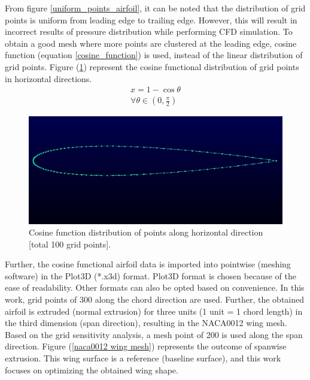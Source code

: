 From figure \ref{uniform_points_airfoil}, it can be noted that the distribution of grid points is uniform from leading edge to trailing edge. However, this will result in incorrect results of pressure distribution while performing CFD simulation. To obtain a good mesh where more points are clustered at the leading edge, cosine function (equation \ref{cosine_function}) is used, instead of the linear distribution of grid points. Figure (\ref{cosine_points_airfoil}) represent the cosine functional distribution of grid points in horizontal directions.
\begin{equation}
    \begin{array}{l}
        x = 1 - \cos{\theta}  \\
        \forall  \theta \in \left(0, \frac{\pi}{2}\right)
    \end{array}
\label{cosine_function}
\end{equation}

\begin{figure}[!htbp]
    \centering
    \includegraphics[scale = 0.4]{figures/airfoil_cosine.png}
    \caption{Cosine function distribution of points along horizontal direction [total 100 grid points].}
    \label{cosine_points_airfoil}
\end{figure}

Further, the cosine functional airfoil data is imported into pointwise (meshing software) in the Plot3D (*.x3d) format. Plot3D format is chosen because of the ease of readability. Other formats can also be opted based on convenience. In this work, grid points of 300 along the chord direction are used. Further, the obtained airfoil is extruded (normal extrusion) for three units (1 unit = 1 chord length) in the third dimension (span direction), resulting in the NACA0012 wing mesh. Based on the grid sensitivity analysis, a mesh point of 200 is used along the span direction. Figure (\ref{naca0012 wing mesh}) represents the outcome of spanwise extrusion. This wing surface is a reference (baseline surface), and this work focuses on optimizing the obtained wing shape. 

